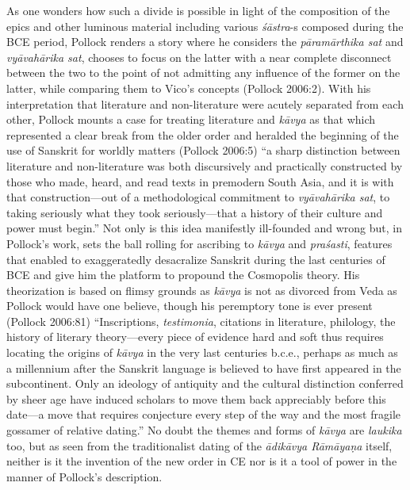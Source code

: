 As one wonders how such a divide is possible in light of the composition of the epics and other luminous material including various \textit{śāstra}-s composed during the BCE period, Pollock renders a story where he considers the \textit{pāramārthika sat} and \textit{vyāvahārika sat}, chooses to focus on the latter with a near complete disconnect between the two to the point of not admitting any influence of the former on the latter, while comparing them to Vico’s concepts (Pollock 2006:2). With his interpretation that literature and non-literature were acutely separated from each other, Pollock mounts a case for treating literature and \textit{kāvya} as that which represented a clear break from the older order and heralded the beginning of the use of Sanskrit for worldly matters (Pollock 2006:5) “a sharp distinction between literature and non-literature was both discursively and practically constructed by those who made, heard, and read texts in premodern South Asia, and it is with that construction—out of a methodological commitment to \textit{vyāvahārika sat}, to taking seriously what they took seriously—that a history of their culture and power must begin.” Not only is this idea manifestly ill-founded and wrong but, in Pollock’s work, sets the ball rolling for ascribing to \textit{kāvya} and \textit{praśasti}, features that enabled to exaggeratedly desacralize Sanskrit during the last centuries of BCE and give him the platform to propound the Cosmopolis theory. His theorization is based on flimsy grounds as \textit{kāvya} is not as divorced from Veda as Pollock would have one believe, though his peremptory tone is ever present (Pollock 2006:81) “Inscriptions, \textit{testimonia}, citations in literature, philology, the history of literary theory—every piece of evidence hard and soft thus requires locating the origins of \textit{kāvya} in the very last centuries b.c.e., perhaps as much as a millennium after the Sanskrit language is believed to have first appeared in the subcontinent. Only an ideology of antiquity and the cultural distinction conferred by sheer age have induced scholars to move them back appreciably before this date—a move that requires conjecture every step of the way and the most fragile gossamer of relative dating.” No doubt the themes and forms of \textit{kāvya} are \textit{laukika} too, but as seen from the traditionalist dating of the \textit{ādikāvya Rāmāyaṇa} itself, neither is it the invention of the new order in CE nor is it a tool of power in the manner of Pollock’s description.

